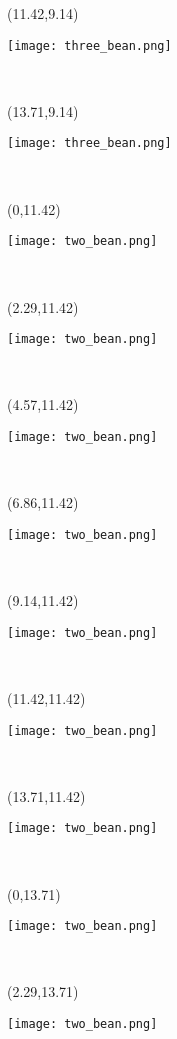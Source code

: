 \documentclass[a4paper]{article}
\newcommand{\myXthreeBean}[0]{
\texttt{[image: three\_bean.png]}
}
\newcommand{\myXtwoBean}[0]{
\texttt{[image: two\_bean.png]}
}
\newcommand{\mycard}[5]{%
	\vspace{0.35cm}
	\tiny #1 #2
	\parbox[t][2.29\TPVertModule][c]{0.150\paperwidth}{%
	\hspace{-0.65cm} \large#3\\
	}
}
\begin{document}
\begin{textblock}{2.29}(11.42,9.14)
\mycard{}{}{
\myXthreeBean
}{}{} 
\end{textblock}

\begin{textblock}{2.29}(13.71,9.14)
\mycard{}{}{
\myXthreeBean
}{}{} 
\end{textblock}


\begin{textblock}{2.29}(0,11.42)
\mycard{}{}{
\myXtwoBean
}{}{} 
\end{textblock}

\begin{textblock}{2.29}(2.29,11.42)
\mycard{}{}{
\myXtwoBean
}{}{} 
\end{textblock}

\begin{textblock}{2.29}(4.57,11.42)
\mycard{}{}{
\myXtwoBean
}{}{} 
\end{textblock}

\begin{textblock}{2.29}(6.86,11.42)
\mycard{}{}{
\myXtwoBean
}{}{} 
\end{textblock}

\begin{textblock}{2.29}(9.14,11.42)
\mycard{}{}{
\myXtwoBean
}{}{} 
\end{textblock}

\begin{textblock}{2.29}(11.42,11.42)
\mycard{}{}{
\myXtwoBean
}{}{} 
\end{textblock}

\begin{textblock}{2.29}(13.71,11.42)
\mycard{}{}{
\myXtwoBean
}{}{} 
\end{textblock}


\begin{textblock}{2.29}(0,13.71)
\mycard{}{}{
\myXtwoBean
}{}{} 
\end{textblock}

\begin{textblock}{2.29}(2.29,13.71)
\mycard{}{}{
\myXtwoBean
}{}{} 
\end{textblock}
\end{document}
